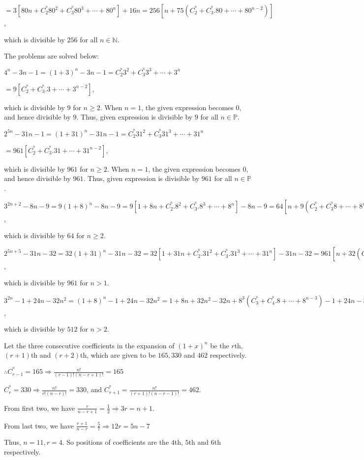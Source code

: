   $= 3[80n + C_2^^n80^2 + C_3^^n80^3 + \cdots + 80^n] + 16n = 256[n + 75(C_2^^n + C_3^^n.80 + \cdots + 80^{n
    - 2})]$,

  which is divisible by $256$ for all $n\in\mathbb{N}$.
\item The problems are solved below:
  \startitemize[i]
  \item $4^n - 3n - 1 = (1 + 3)^n - 3n - 1 = C_2^^n3^2 + C_3^^n3^3 + \cdots + 3^n$

    $= 9[C_2^^n + C_3^^n.3 + \cdots + 3^{n - 2}]$,

    which is divisible by $9$ for $n\geq 2$. When $n = 1$, the given expression becomes $0$, and hence
    divisible by $9$. Thus, given expression is divisible by $9$ for all $n\in\mathbb{P}$.
  \item $2^{5n} - 31n - 1 = (1 + 31)^n - 31n - 1 = C_2^^n31^2 + C_3^^n31^3 + \cdots + 31^n$

    $= 961[C_2^^n + C_3^^n.31 + \cdots + 31^{n - 2}]$,

    which is divisible by $961$ for $n\geq 2$. When $n = 1$, the given expression becomes $0$, and hence
    divisible by $961$. Thus, given expression is divisible by $961$ for all $n\in\mathbb{P}$.
  \item $3^{2n + 2} - 8n - 9 = 9(1 + 8)^n - 8n - 9 = 9[1 + 8n + C_2^^n.8^2 + C_3^^n.8^3 + \cdots + 8^n] - 8n
    - 9 = 64[n + 9(C_2^^n + C_3^^n8 + \cdots + 8^{n - 2})]$,

    which is divisible by $64$ for $n\geq 2$.
  \item $2^{5n + 5} - 31n - 32 = 32(1 + 31)^n - 31n - 32 = 32[1 + 31n + C_2^^n.31^2 + C_3^^n.31^3 + \cdots +
    31^n] - 31n - 32 = 961[n + 32(C_2^^n + C_3^^n31 + \cdots + 31^{n - 2})]$,

    which is divisible by $961$ for $n > 1$.
  \item $3^{2n} - 1 + 24n - 32n^2 = (1 + 8)^n - 1 + 24n - 32n^2 = 1 + 8n + 32n^2 - 32n + 8^3(C_3^^n +
    C_4^^n.8 + \cdots + 8^{n - 3}) - 1 + 24n - 32n^2 = 8^3(C_3^^n +
    C_4^^n.8 + \cdots + 8^{n - 3})$,

    which is divisible by $512$ for $n > 2$.
  \stopitemize
\item Let the three consecutive coefficients in the expansion of $(1 + x)^n$ be the $r$th, $(r + 1)$th and
  $(r + 2)$th, which are given to be $165, 330$ and $462$ respectively.

  $\therefore C_{r - 1}^^n = 165 \Rightarrow \frac{n!}{(r - 1)!(n - r + 1)!} = 165$

  $C_r^^n = 330 \Rightarrow \frac{n!}{r!(n - r)!} = 330$, and $C_{r + 1}^^n = \frac{n!}{(r + 1)!(n - r -
  1)!} = 462$.

  From first two, we have $\frac{r}{n - r + 1}= \frac{1}{2} \Rightarrow 3r = n + 1$.

  From last two, we have $\frac{r + 1}{n - r} = \frac{5}{7}\Rightarrow 12r = 5n - 7$

  Thus, $n = 11, r = 4$. So positions of coefficients are the $4$th, $5$th and $6$th respectively.
\stopitemize